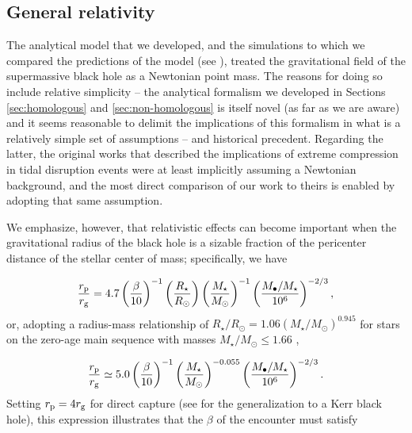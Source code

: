 \documentclass[twocolumn]{aastex62}
\begin{document}
\subsection{{General relativity}}
\label{sec:gr}
The analytical model that we developed, and the simulations to which we compared the predictions of the model (see \citealt{norman21}), treated the gravitational field of the supermassive black hole as a Newtonian point mass. The reasons for doing so include relative simplicity -- the analytical formalism we developed in Sections \ref{sec:homologous} and \ref{sec:non-homologous} is itself novel (as far as we are aware) and it seems reasonable to delimit the implications of this formalism in what is a relatively simple set of assumptions -- and historical precedent. Regarding the latter, the original works that described the implications of extreme compression in tidal disruption events were at least implicitly assuming a Newtonian background, and the most direct comparison of our work to theirs is enabled by adopting that same assumption.

We emphasize, however, that relativistic effects can become important when the gravitational radius of the black hole is a sizable fraction of the pericenter distance of the stellar center of mass; specifically, we have

\begin{equation}
\frac{r_{\rm p}}{r_{\rm g}} = 4.7\left(\frac{\beta}{10}\right)^{-1}\left(\frac{R_{\star}}{R_{\odot}}\right)\left(\frac{M_{\star}}{M_{\odot}}\right)^{-1}\left(\frac{M_{\bullet}/M_{\star}}{10^{6}}\right)^{-2/3}
\label{rtrg},
\end{equation}
or, adopting a radius-mass relationship of $R_{\star}/R_{\odot} = 1.06 \left(M_{\star}/M_{\odot}\right)^{0.945}$ for stars on the zero-age main sequence with masses $M_{\star}/M_{\odot} \le 1.66$ \citep{demircan91}, 

\begin{equation}
\frac{r_{\rm p}}{r_{\rm g}} \simeq 5.0\left(\frac{\beta}{10}\right)^{-1}\left(\frac{M_{\star}}{M_{\odot}}\right)^{-0.055}\left(\frac{M_{\bullet}/M_{\star}}{10^{6}}\right)^{-2/3}.
\end{equation}
Setting $r_{\rm p} = 4 r_{\rm g}$ for direct capture (see \citealt{kesden12} for the generalization to a Kerr black hole), this expression illustrates that the $\beta$ of the encounter must satisfy
\end{document}
